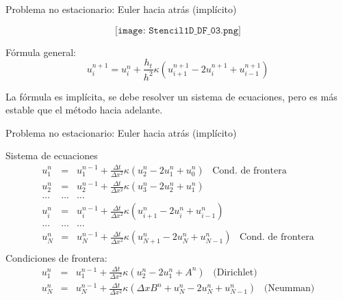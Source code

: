 \documentclass[handout]{beamer}
\begin{document}
\begin{frame}{Problema no estacionario: Euler hacia atr\'as (impl\'icito)}
	
	$$\texttt{[image: Stencil1D\_DF\_03.png]}$$
	
	\begin{small}
		
		F\'ormula general:
		\begin{displaymath}
		u_{i}^{n+1} = u_{i}^{n} + \frac{h_t}{h^2} \kappa \left(u_{i+1}^{n+1} - 2 u_{i}^{n+1} + u_{i-1}^{n+1}\right)
		\end{displaymath}	
		
		
		La f\'ormula es impl\'icita, se debe resolver un sistema de ecuaciones, pero es m\'as estable que el m\'etodo hacia adelante.
	\end{small}
	
\end{frame}

\begin{frame}{Problema no estacionario: Euler hacia atr\'as (impl\'icito)}

Sistema de ecuaciones
\begin{eqnarray*}
u_{1}^{n} & = & u_{1}^{n-1} + \frac{\Delta t}{\Delta x^2} \kappa \left(u_{2}^{n} - 2 u_{1}^{n} + \boxed{u_{0}^{n}}\right) \,\,\, \mbox{ Cond. de frontera}\\
u_{2}^{n} & = & u_{2}^{n-1} + \frac{\Delta t}{\Delta x^2} \kappa \left(u_{3}^{n} - 2 u_{2}^{n} + u_{1}^{n}\right) \\
\dots & \dots & \dots \\
u_{i}^{n} & = & u_{i}^{n-1} + \frac{\Delta t}{\Delta x^2} \kappa \left(u_{i+1}^{n} - 2 u_{i}^{n} + u_{i-1}^{n}\right) \\
\dots & \dots & \dots \\
u_{N}^{n} & = & u_{N}^{n-1} + \frac{\Delta t}{\Delta x^2} \kappa \left(\boxed{u_{N+1}^{n}} - 2 u_{N}^{n} + u_{N-1}^{n}\right) \,\,\, \mbox{ Cond. de frontera}\\
\end{eqnarray*}
\pause
Condiciones de frontera:
\begin{eqnarray*}
u_{1}^{n} & = & u_{1}^{n-1} + \frac{\Delta t}{\Delta x^2} \kappa \left(u_{2}^{n} - 2 u_{1}^{n} + \boxed{A^{n}}\right) \,\,\,\,\, \mbox{(Dirichlet)} \\
u_{N}^{n} & = & u_{N}^{n-1} + \frac{\Delta t}{\Delta x^2} \kappa \left(\boxed{\Delta x B^{n} + u_{N}^{n}} - 2 u_{N}^{n} + u_{N-1}^{n}\right) \,\,\,\,\, \mbox{(Neumman)}\\
\end{eqnarray*}

\end{frame}
\end{document}
